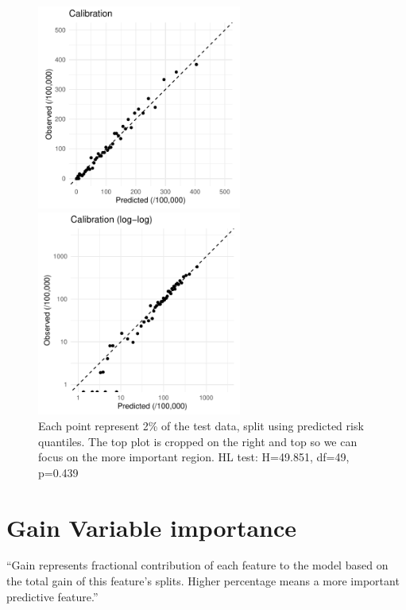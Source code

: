 \documentclass[12pt]{article}
\begin{document}
\begin{figure}[h]
\centering
\includegraphics[width=0.6\textwidth]{figures/calibration50_all_zoom.pdf}
\includegraphics[width=0.6\textwidth]{figures/calibration50_all_log.pdf} \\
Each point represent 2\% of the test data, split using predicted risk quantiles. The top plot is cropped on the right and top
 so we can focus on the more important region. HL test: H=49.851, df=49, p=0.439

\end{figure}


\clearpage



\clearpage

\section*{Gain Variable importance}

``Gain represents fractional contribution of each feature to the model based on the total gain of this feature's splits. 
Higher percentage means a more important predictive feature.''
\end{document}
